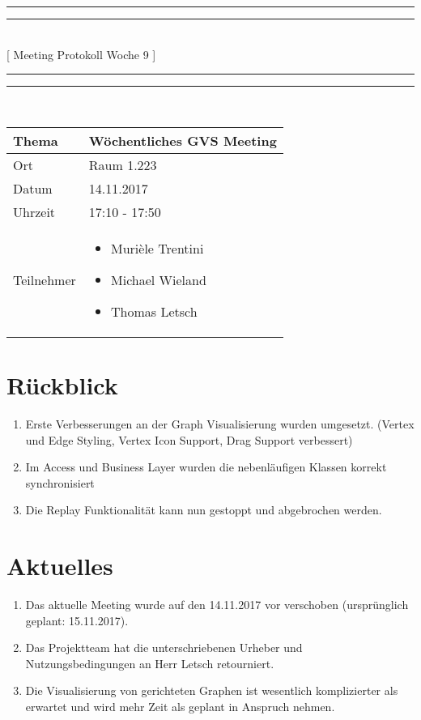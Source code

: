 \documentclass[11pt, a4paper,oneside]{scrartcl}
\begin{document}
\centering
\rule{\textwidth}{1.6pt}\vspace*{-\baselineskip}\vspace*{2pt} %
\rule{\textwidth}{0.4pt}\\[\baselineskip] %
{\LARGE [ Meeting Protokoll Woche 9 ]}\\[0.2\baselineskip] %
\rule{\textwidth}{0.4pt}\vspace*{-\baselineskip}\vspace{3.2pt} %
\rule{\textwidth}{1.6pt}\\[2\baselineskip] %

\begin{tabu} to \linewidth {l X }
	\toprule
	\textbf{Thema} & \textbf{Wöchentliches GVS Meeting} \\
	\midrule
	Ort & Raum 1.223 \\
	Datum & 14.11.2017  \\
	Uhrzeit &  17:10 - 17:50 \\
	Teilnehmer & 
	\begin{minipage}[t]{\textwidth}
	  	\begin{itemize}
			\item Murièle Trentini
			\item Michael Wieland
			\item Thomas Letsch
	  	\end{itemize}
	\end{minipage}
	\\
	\bottomrule
\end{tabu}


\section{Rückblick}
\begin{enumerate}
	\item Erste Verbesserungen an der Graph Visualisierung wurden umgesetzt. (Vertex und Edge Styling, Vertex Icon Support, Drag Support verbessert)
	\item Im Access und Business Layer wurden die nebenläufigen Klassen korrekt synchronisiert
	\item Die Replay Funktionalität kann nun gestoppt und abgebrochen werden.
\end{enumerate}

\section{Aktuelles}
\begin{enumerate}
	\item Das aktuelle Meeting wurde auf den 14.11.2017 vor verschoben (ursprünglich geplant: 15.11.2017).
	\item Das Projektteam hat die unterschriebenen Urheber und Nutzungsbedingungen an Herr Letsch retourniert.
	\item Die Visualisierung von gerichteten Graphen ist wesentlich komplizierter als erwartet und wird mehr Zeit als geplant in Anspruch nehmen.
\end{enumerate}
\end{document}
